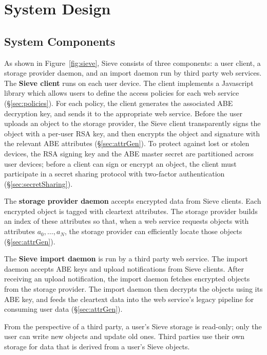 \chapter{System Design}
\label{sec:design}

\section{System Components}
As shown in Figure~\ref{fig:sieve}, Sieve
consists of three components: a user client,
a storage provider daemon, and an import
daemon run by third party web
services. The \textbf{Sieve client} runs
on each user device. The client implements
a Javascript library which allows users to define the
access policies for each web service
(\S\ref{sec:policies}). For each policy, the
client generates the associated ABE
decryption key, and sends it to the
appropriate web service. Before the user
uploads an object to the storage provider,
the Sieve client transparently signs the
object with a per-user RSA key, and then
encrypts the object and signature with the
relevant ABE attributes (\S\ref{sec:attrGen}).
To protect against lost or stolen devices,
the RSA signing key and the ABE master secret
are partitioned across user devices; before a
client can sign or encrypt an object, the
client must participate in a secret sharing
protocol with two-factor authentication
(\S\ref{sec:secretSharing}).

The \textbf{storage provider daemon}
accepts encrypted data from Sieve clients.
Each encrypted object is tagged with
cleartext attributes. The storage provider
builds an index of these attributes so
that, when a web service requests objects
with attributes $a_0,\ldots,a_N$, the
storage provider can efficiently locate
those objects (\S\ref{sec:attrGen}).

The \textbf{Sieve import daemon} is run
by a third party web service. The import
daemon accepts ABE keys and upload
notifications from Sieve clients. After
receiving an upload notification, the import
daemon fetches encrypted objects from the
storage provider. The import daemon then
decrypts the objects using its ABE key,
and feeds the cleartext data into the
web service's legacy pipeline for consuming
user data (\S\ref{sec:attrGen}).

From the perspective of a third party,
a user's Sieve storage is read-only;
only the user can write
new objects and update old ones. Third
parties use their own storage for data
that is derived from a user's Sieve
objects.

